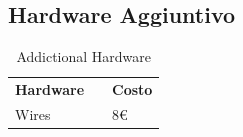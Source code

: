 \subsection{Hardware Aggiuntivo}

\begin{table}[]
\centering
\begin{tabular}{lll}
\multicolumn{1}{c}{\textbf{Hardware}} &  & \multicolumn{1}{c}{\textbf{Costo}} \\
Wires                                 &  &                   8\euro                \\

\end{tabular}
\caption{Addictional Hardware}


\label{Addictional Hardware}
\end{table}

\newpage
